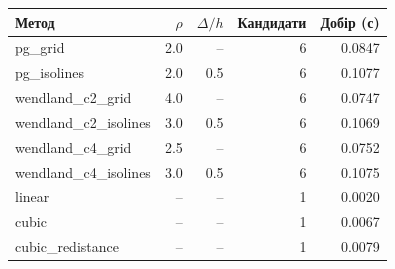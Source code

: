 \begin{tabular}{lrrrr}\toprule
Метод & $\rho$ & $\Delta/h$ & Кандидати & Добір (с) \\ \midrule
pg\_grid & 2.0 & -- & 6 & 0.0847 \\
pg\_isolines & 2.0 & 0.5 & 6 & 0.1077 \\
wendland\_c2\_grid & 4.0 & -- & 6 & 0.0747 \\
wendland\_c2\_isolines & 3.0 & 0.5 & 6 & 0.1069 \\
wendland\_c4\_grid & 2.5 & -- & 6 & 0.0752 \\
wendland\_c4\_isolines & 3.0 & 0.5 & 6 & 0.1075 \\
linear & -- & -- & 1 & 0.0020 \\
cubic & -- & -- & 1 & 0.0067 \\
cubic\_redistance & -- & -- & 1 & 0.0079 \\
\bottomrule\end{tabular}
